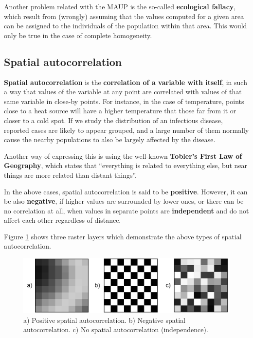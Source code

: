 Another problem related with the MAUP is the so-called \textbf{ecological fallacy}, which result from (wrongly) assuming that the values computed for a given area can be assigned to the individuals of the population within that area. This would only be true in the case of complete homogeneity.


\subsection{Spatial autocorrelation} 

\textbf{Spatial autocorrelation} is the \textbf{correlation of a variable with itself}, in such a way that values of the variable at any point are correlated with values of that same variable in close-by points. For instance, in the case of temperature, points close to a heat source will have a higher temperature that those far from it or closer to a cold spot. If we study the distribution of an infectious disease, reported cases are likely to appear grouped, and a large number of them normally cause the nearby populations to also be largely affected by the disease.

Another way of expressing this is using the well-known \textbf{Tobler's First Law of Geography}, which states that ``everything is related to everything else, but near things are more related than distant things''.

In the above cases, spatial autocorrelation is said to be \textbf{positive}. However, it can be also \textbf{negative}, if higher values are surrounded by lower ones, or there can be no correlation at all, when values in separate points are \textbf{independent} and do not affect each other regardless of distance.

Figure \ref{Fig:Autocorrelation} shows three raster layers which demonstrate the above types of spatial autocorrelation.

\begin{figure}[!hbt]   
\centering
\includegraphics[width=\textwidth]{Analysis/Autocorrelation.png}
\caption{\small a) Positive spatial autocorrelation. b) Negative spatial autocorrelation. c) No spatial autocorrelation (independence).}
\label{Fig:Autocorrelation} 
\end{figure}

